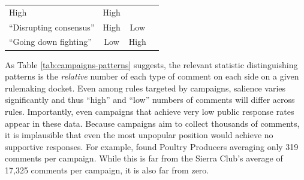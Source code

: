 \documentclass[
      12pt,
        ]{article}
\begin{document}
\begin{longtable}[]{@{}lccc@{}}
\begin{minipage}[t]{0.23\columnwidth}
High\strut
\end{minipage} & \begin{minipage}[t]{0.23\columnwidth}\centering
High\strut
\end{minipage} & \begin{minipage}[t]{0.23\columnwidth}\centering
\strut
\end{minipage}\tabularnewline
\begin{minipage}[t]{0.19\columnwidth}\raggedright
``Disrupting consensus''\strut
\end{minipage} & \begin{minipage}[t]{0.23\columnwidth}\centering
High\strut
\end{minipage} & \begin{minipage}[t]{0.23\columnwidth}\centering
Low\strut
\end{minipage} & \begin{minipage}[t]{0.23\columnwidth}\centering
\strut
\end{minipage}\tabularnewline
\begin{minipage}[t]{0.19\columnwidth}\raggedright
``Going down fighting''\strut
\end{minipage} & \begin{minipage}[t]{0.23\columnwidth}\centering
Low\strut
\end{minipage} & \begin{minipage}[t]{0.23\columnwidth}\centering
High\strut
\end{minipage} & \begin{minipage}[t]{0.23\columnwidth}\centering
\strut
\end{minipage}\tabularnewline
\bottomrule
\end{longtable}

As Table
\ref{tab:campaigns-patterns} suggests, the relevant statistic
distinguishing patterns is the \emph{relative} number of each type of comment
on each side on a given rulemaking docket. Even among rules targeted by
campaigns, salience varies significantly and thus ``high'' and ``low''
numbers of comments will differ across rules. Importantly, even
campaigns that achieve very low public response rates appear in these
data. Because campaigns aim to collect thousands of comments, it is
implausible that even the most unpopular position would achieve no
supportive responses. For example, \citet{Potter2017} found Poultry Producers
averaging only 319 comments per campaign. While this is far from the
Sierra Club's average of 17,325 comments per campaign, it is also far
from zero.
\end{document}
